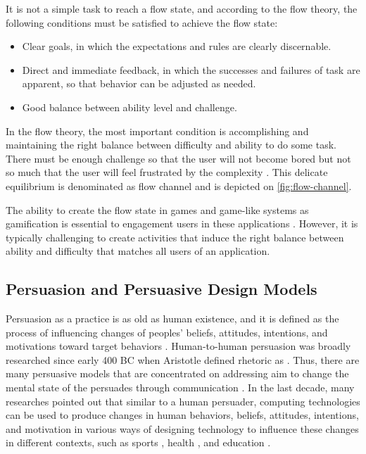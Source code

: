 It is not a simple task to reach a flow state, and according to the flow theory, the following conditions must be satisfied to achieve the flow state:

\begin{itemize}
\item Clear goals, in which the expectations and rules are clearly discernable.
\item Direct and immediate feedback, in which the successes and failures of task are apparent, so that behavior can be adjusted as needed.
\item Good balance between ability level and challenge.
\end{itemize}

In the flow theory, the most important condition is accomplishing and maintaining the right balance between difficulty and ability to do some task. There must be enough challenge so that the user will not become bored but not so much that the user will feel frustrated by the complexity \cite{Csikszentmihalyi2008}. This delicate equilibrium is denominated as flow channel and is depicted on \autoref{fig:flow-channel}.

The ability to create the flow state in games and game-like systems as gamification is essential to engagement users in these applications \cite{Xu2011}. However, it is typically challenging to create activities that induce the right balance between ability and difficulty that matches all users of an application.

\subsection{Persuasion and Persuasive Design Models}
\label{subsec:persuasive-theories-persuasive-design-models}

Persuasion as a practice is as old as human existence, and it is defined as the process of influencing changes of peoples' beliefs, attitudes, intentions, and motivations toward target behaviors \cite{SeiterGass2004}. Human-to-human persuasion was broadly researched since early 400 BC when Aristotle defined rhetoric as  \cite{Natanson1955}. Thus, there are many persuasive models that are concentrated on addressing aim to change the mental state of the persuades through communication \cite{GueriniStockZancanaro2007}.
In the last decade, many researches pointed out that similar to a human persuader, computing technologies can be used to produce changes in human behaviors, beliefs, attitudes, intentions, and motivation in various ways of designing technology to influence these changes in different contexts, such as sports \cite{HarjumaaSegerstaahlOinas-Kukkonen2009}, health \cite{OrjiVassilevaMandryk2014}, and education \cite{LuceroZuloagaMotaMunoz2006, GohSeetChen2011}.

